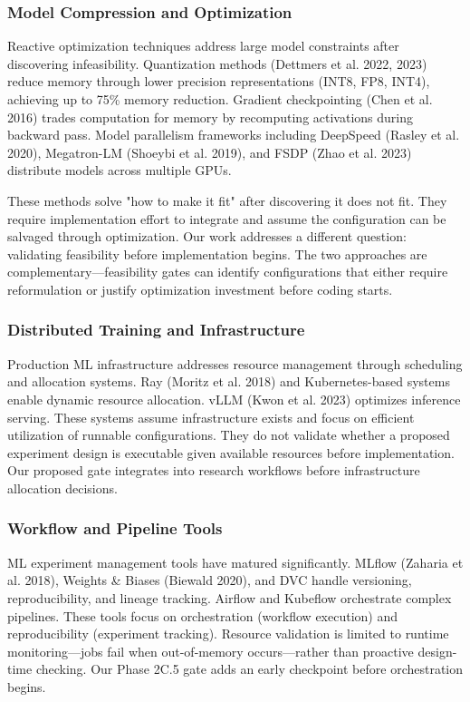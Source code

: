 
\subsubsection{Model Compression and Optimization}

Reactive optimization techniques address large model constraints after discovering infeasibility. Quantization methods (Dettmers et al. 2022, 2023) reduce memory through lower precision representations (INT8, FP8, INT4), achieving up to 75\% memory reduction. Gradient checkpointing (Chen et al. 2016) trades computation for memory by recomputing activations during backward pass. Model parallelism frameworks including DeepSpeed (Rasley et al. 2020), Megatron-LM (Shoeybi et al. 2019), and FSDP (Zhao et al. 2023) distribute models across multiple GPUs.

These methods solve "how to make it fit" after discovering it does not fit. They require implementation effort to integrate and assume the configuration can be salvaged through optimization. Our work addresses a different question: validating feasibility before implementation begins. The two approaches are complementary—feasibility gates can identify configurations that either require reformulation or justify optimization investment before coding starts.

\subsubsection{Distributed Training and Infrastructure}

Production ML infrastructure addresses resource management through scheduling and allocation systems. Ray (Moritz et al. 2018) and Kubernetes-based systems enable dynamic resource allocation. vLLM (Kwon et al. 2023) optimizes inference serving. These systems assume infrastructure exists and focus on efficient utilization of runnable configurations. They do not validate whether a proposed experiment design is executable given available resources before implementation. Our proposed gate integrates into research workflows before infrastructure allocation decisions.

\subsubsection{Workflow and Pipeline Tools}

ML experiment management tools have matured significantly. MLflow (Zaharia et al. 2018), Weights \& Biases (Biewald 2020), and DVC handle versioning, reproducibility, and lineage tracking. Airflow and Kubeflow orchestrate complex pipelines. These tools focus on orchestration (workflow execution) and reproducibility (experiment tracking). Resource validation is limited to runtime monitoring—jobs fail when out-of-memory occurs—rather than proactive design-time checking. Our Phase 2C.5 gate adds an early checkpoint before orchestration begins.

